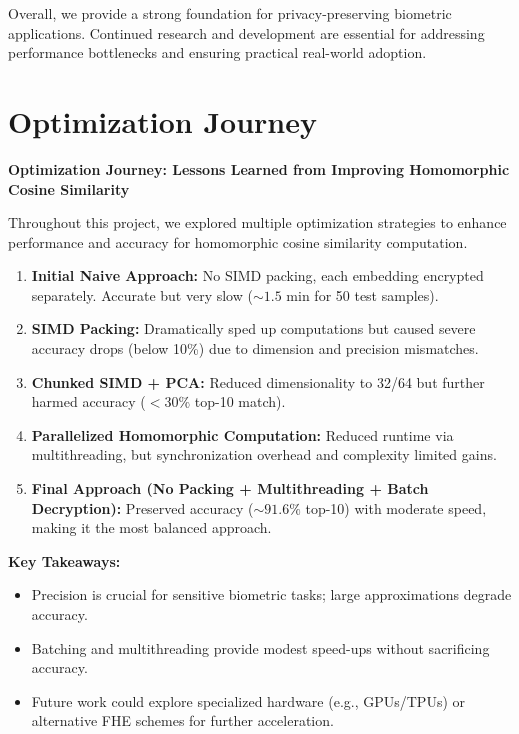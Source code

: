 \documentclass[12pt,a4paper]{article}
\begin{document}
Overall, we provide a strong foundation for privacy-preserving biometric applications. Continued 
research and development are essential for addressing performance bottlenecks and ensuring practical 
real-world adoption.

\newpage

 

\appendix
\section{Optimization Journey}
\label{appendix:optimization}

\textbf{Optimization Journey: Lessons Learned from Improving Homomorphic Cosine Similarity}

Throughout this project, we explored multiple optimization strategies to enhance performance and 
accuracy for homomorphic cosine similarity computation.

\begin{enumerate}
    \item \textbf{Initial Naive Approach:} No SIMD packing, each embedding encrypted separately. 
    Accurate but very slow (\(\sim1.5\) min for 50 test samples).
    \item \textbf{SIMD Packing:} Dramatically sped up computations but caused severe accuracy drops 
    (below 10\%) due to dimension and precision mismatches.
    \item \textbf{Chunked SIMD + PCA:} Reduced dimensionality to 32/64 but further harmed accuracy 
    (\(<30\%\) top-10 match).
    \item \textbf{Parallelized Homomorphic Computation:} Reduced runtime via multithreading, but 
    synchronization overhead and complexity limited gains.
    \item \textbf{Final Approach (No Packing + Multithreading + Batch Decryption):} Preserved 
    accuracy (\(\sim91.6\%\) top-10) with moderate speed, making it the most balanced approach.
\end{enumerate}

\noindent
\textbf{Key Takeaways:}
\begin{itemize}
    \item Precision is crucial for sensitive biometric tasks; large approximations degrade accuracy.
    \item Batching and multithreading provide modest speed-ups without sacrificing accuracy.
    \item Future work could explore specialized hardware (e.g., GPUs/TPUs) or alternative FHE schemes 
    for further acceleration.
\end{itemize}
\end{document}
